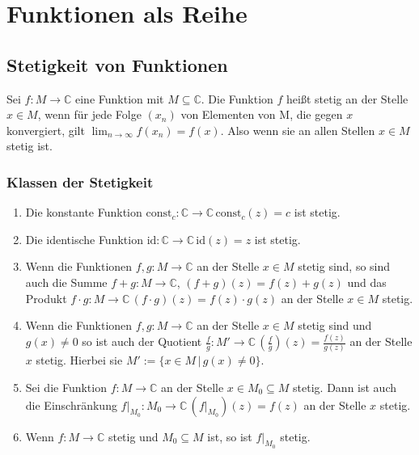 \documentclass[a4paper,12pt]{article}
\numberwithin{equation}{section}
\begin{document}
\section{Funktionen als Reihe}
\subsection{Stetigkeit von Funktionen}
Sei $f:M\rightarrow \mathbb{C}$ eine Funktion mit $M\subseteq \mathbb{C}$. Die Funktion $f$ heißt stetig an der Stelle $x \in M$, wenn für jede Folge $\left(x_n\right)$ von Elementen von M, die gegen $x$ konvergiert, gilt $\lim_{n\rightarrow \infty}f\left(x_n\right)=f\left(x\right)$. Also wenn sie an allen Stellen $x \in M$ stetig ist.

\subsubsection{Klassen der Stetigkeit}
\begin{enumerate}[label=(\alph*)]
        \item Die konstante Funktion $\text{const}_c:\mathbb{C}\rightarrow \mathbb{C}\,\text{const}_c\left(z\right)=c$ ist stetig.
        \item Die identische Funktion $\text{id}:\mathbb{C}\rightarrow \mathbb{C}\,\text{id}\left(z\right)=z$ ist stetig.
        \item Wenn die Funktionen $f,g:M\rightarrow \mathbb{C}$ an der Stelle $x \in M$ stetig sind, so sind auch die Summe $f+g:M\rightarrow \mathbb{C}$, $\left(f+g\right)\left(z\right)=f\left(z\right)+g\left(z\right)$ und das Produkt $f\cdot g:M\rightarrow \mathbb{C}\,\left(f\cdot g\right)\left(z\right)=f\left(z\right)\cdot g\left(z\right)$ an der Stelle $x \in M$ stetig.
        \item Wenn die Funktionen $f,g:M\rightarrow \mathbb{C}$ an der Stelle $x \in M$ stetig sind und $g\left(x\right)\neq 0$ so ist auch der Quotient $\tfrac{f}{g}:M'\rightarrow \mathbb{C}\,\left(\tfrac{f}{g}\right)\left(z\right)=\tfrac{f\left(z\right)}{g\left(z\right)}$ an der Stelle $x$ stetig. Hierbei sie $M':=\{x \in M\,|\, g\left(x\right)\neq 0\}$.
        \item Sei die Funktion $f:M\rightarrow \mathbb{C}$ an der Stelle $x \in M_0\subseteq M$ stetig. Dann ist auch die Einschränkung $f|_{M_0}:M_0\rightarrow \mathbb{C}\,\left(f|_{M_0}\right)\left(z\right)=f\left(z\right)$ an der Stelle $x$ stetig.
        \item Wenn $f:M\rightarrow \mathbb{C}$ stetig und $M_0\subseteq M$ ist, so ist $f|_{M_0}$ stetig.
\end{enumerate}
\end{document}
